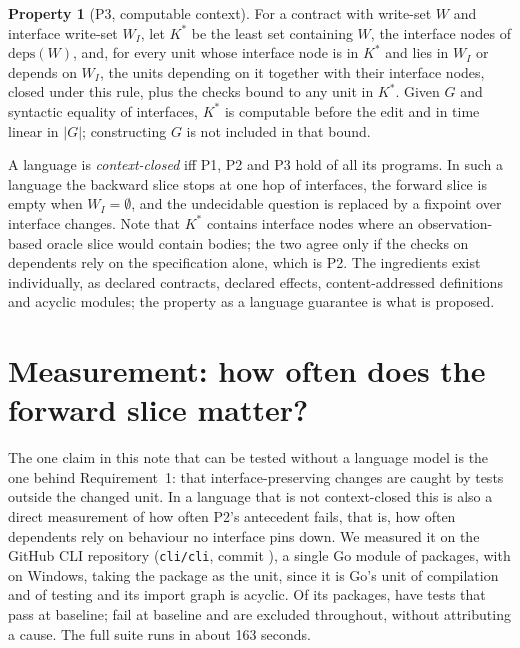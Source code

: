\documentclass[10pt]{article}
\theoremstyle{definition}
\newtheorem{property}{Property}
\theoremstyle{plain}
\theoremstyle{remark}
\newcommand{\baseSecs}{163}
\begin{document}
\begin{property}[P3, computable context]
For a contract with write-set $W$ and interface write-set $W_I$, let $K^*$ be the least set containing $W$, the interface nodes of $\mathrm{deps}(W)$, and, for every unit whose interface node is in $K^*$ and lies in $W_I$ or depends on $W_I$, the units depending on it together with their interface nodes, closed under this rule, plus the checks bound to any unit in $K^*$. Given $G$ and syntactic equality of interfaces, $K^*$ is computable before the edit and in time linear in $|G|$; constructing $G$ is not included in that bound.
\end{property}

A language is \emph{context-closed} iff P1, P2 and P3 hold of all its programs. In such a language the backward slice stops at one hop of interfaces, the forward slice is empty when $W_I = \emptyset$, and the undecidable question is replaced by a fixpoint over interface changes. Note that $K^*$ contains interface nodes where an observation-based oracle slice would contain bodies; the two agree only if the checks on dependents rely on the specification alone, which is P2. The ingredients exist individually, as declared contracts, declared effects, content-addressed definitions and acyclic modules; the property as a language guarantee is what is proposed.

\section{Measurement: how often does the forward slice matter?}\label{sec:measure}

The one claim in this note that can be tested without a language model is the one behind Requirement~1: that interface-preserving changes are caught by tests outside the changed unit. In a language that is not context-closed this is also a direct measurement of how often P2's antecedent fails, that is, how often dependents rely on behaviour no interface pins down. We measured it on the GitHub CLI repository (\texttt{cli/cli}, commit \texttt{\cliCorpusCommit}), a single Go module of \cliNPkgs{} packages, with \cliGoVersion{} on Windows, taking the package as the unit, since it is Go's unit of compilation and of testing and its import graph is acyclic. Of its packages, \cliNTestPkgs{} have tests that pass at baseline; \cliNBaseFail{} fail at baseline and are excluded throughout, without attributing a cause. The full suite runs in about \baseSecs{} seconds.
\end{document}
